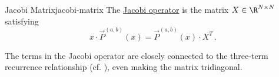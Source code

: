\begin{definition}{Jacobi Matrix}{jacobi-matrix}
  The \href{https://en.wikipedia.org/wiki/Jacobi_operator}{Jacobi operator} is the matrix \(X \in \R^{N \times N}\) satisfying
  $$x \cdot \vec{P}^{(a,b)}(x) = \vec{P}^{(a,b)}(x) \cdot X^T\,.$$
\end{definition}

The terms in the Jacobi operator are closely connected to the three-term recurrence relationship (cf. ), even making the matrix tridiagonal.
